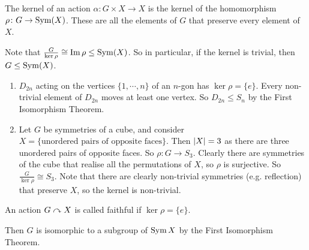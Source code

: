 \begin{definition}
	The kernel of an action $\alpha\colon G \times X \to X$ is the kernel of the homomorphism $\rho\colon G \to \operatorname{Sym}(X)$. These are all the elements of $G$ that preserve every element of $X$.
\end{definition}
Note that $\frac{G}{\ker \rho} \cong \Im \rho \leq \operatorname{Sym}(X)$. So in particular, if the kernel is trivial, then $G \leq \operatorname{Sym}(X)$.
\begin{enumerate}
	\item $D_{2n}$ acting on the vertices $\{ 1, \cdots, n \}$ of an $n$-gon has $\ker\rho = \{ e \}$. Every non-trivial element of $D_{2n}$ moves at least one vertex. So $D_{2n} \leq S_n$ by the First Isomorphism Theorem.
	\item Let $G$ be symmetries of a cube, and consider $X = \{ \text{unordered pairs of opposite faces} \}$. Then $\abs{X} = 3$ as there are three unordered pairs of opposite faces. So $\rho\colon G \to S_3$. Clearly there are symmetries of the cube that realise all the permutations of $X$, so $\rho$ is surjective. So $\frac{G}{\ker \rho} \cong S_3$. Note that there are clearly non-trivial symmetries (e.g. reflection) that preserve $X$, so the kernel is non-trivial.
\end{enumerate}
\begin{definition}
	An action $G \curvearrowright X$ is called faithful if $\ker \rho = \{ e \}$.
\end{definition}
Then $G$ is isomorphic to a subgroup of $\operatorname{Sym} X$ by the First Isomorphism Theorem.
